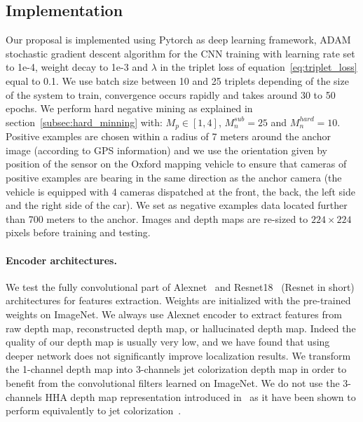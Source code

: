 \subsection{Implementation}
\label{subsec:implementation}

Our proposal is implemented using Pytorch as deep learning framework, ADAM stochastic gradient descent algorithm for the CNN training with learning rate set to 1e-4, weight decay to 1e-3 and $\lambda$ in the triplet loss of equation~\ref{eq:triplet_loss} equal to 0.1. We use batch size between 10 and 25 triplets depending of the size of the system to train, convergence occurs rapidly and takes around 30 to 50 epochs. We perform hard negative mining as explained in section~\ref{subsec:hard_minning} with: $M_p \in [1, 4]$, $M_n^{sub} = 25$ and $M_n^{hard} = 10$. Positive examples are chosen within a radius of 7 meters around the anchor image  (according to GPS information) and we use the orientation given by position of the sensor on the Oxford mapping vehicle to ensure that cameras of positive examples are bearing in the same direction as the anchor camera (the vehicle is equipped with 4 cameras dispatched at the front, the back, the left side and the right side of the car). We set as negative examples data located further than 700 meters to the anchor. Images and depth maps are re-sized to $224\times224$ pixels before training and testing. 

\paragraph{Encoder architectures.}
We test the fully convolutional part of Alexnet~\citep{Krizhevsky2012} and Resnet18~\citep{he2016deep} (Resnet in short) architectures for features extraction. Weights are initialized with the pre-trained weights on ImageNet. We always use Alexnet encoder to extract features from raw depth map, reconstructed depth map, or hallucinated depth map. Indeed the quality of our depth map is usually very low, and we have found that using deeper network does not significantly improve localization results. We transform the 1-channel depth map into 3-channels jet colorization depth map in order to benefit from the convolutional filters learned on ImageNet. We do not use the 3-channels HHA depth map representation introduced in~\cite{Gupta2014} as it have been shown to perform equivalently to jet colorization~\cite{Eitel2015}.

